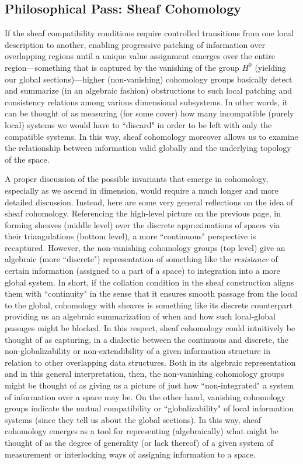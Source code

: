 \documentclass[a4paper]{book}
\theoremstyle{definition}
\theoremstyle{definition}
\theoremstyle{definition}
\theoremstyle{theorem}
\theoremstyle{definition}
\begin{document}
\subsection{Philosophical Pass: Sheaf Cohomology}
If the sheaf compatibility conditions require controlled transitions from one local description to another, enabling progressive patching of information over overlapping regions until a unique value assignment emerges over the entire region---something that is captured by the vanishing of the group $H^0$ (yielding our global sections)---higher (non-vanishing) cohomology groups basically detect and summarize (in an algebraic fashion) obstructions to such local patching and consistency relations among various dimensional subsystems. In other words, it can be thought of as measuring (for some cover) how many incompatible (purely local) systems we would have to ``discard" in order to be left with only the compatible systems. In this way, sheaf cohomology moreover allows us to examine the relationship between information valid globally and the underlying topology of the space. \par 
A proper discussion of the possible invariants that emerge in cohomology, especially as we ascend in dimension, would require a much longer and more detailed discussion. Instead, here are some very general reflections on the idea of sheaf cohomology. Referencing the high-level picture on the previous page, in forming sheaves (middle level) over the discrete approximations of spaces via their triangulations (bottom level), a more ``continuous" perspective is recaptured. However, the non-vanishing cohomology groups (top level) give an algebraic (more ``discrete") representation of something like the \textit{resistance} of certain information (assigned to a part of a space) to integration into a more global system. In short, if the collation condition in the sheaf construction aligns them with ``continuity" in the sense that it ensures smooth passage from the local to the global, cohomology with sheaves is something like its discrete counterpart providing us an algebraic summarization of when and how such local-global passages might be blocked. In this respect, sheaf cohomology could intuitively be thought of as capturing, in a dialectic between the continuous and discrete, the non-globalizability or non-extendibility of a given information structure in relation to other overlapping data structures. Both in its algebraic representation and in this general interpretation, then, the non-vanishing cohomology groups might be thought of as giving us a picture of just how ``non-integrated" a system of information over a space may be. On the other hand, vanishing cohomology groups indicate the mutual compatibility or ``globalizability" of local information systems (since they tell us about the global sections). In this way, sheaf cohomology emerges as a tool for representing (algebraically) what might be thought of as the degree of generality (or lack thereof) of a given system of measurement or interlocking ways of assigning information to a space. \par 
\end{document}
